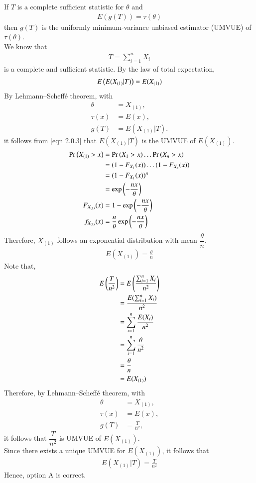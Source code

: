 \documentclass[journal,12pt,twocolumn]{IEEEtran}
\begin{document}
If $T$ is a complete sufficient statistic for $\theta$ and 
\begin{align}
\label{eqn 2.0.1}
E(g(T)) = \tau(\theta)
\end{align}
then $g(T)$ is the uniformly minimum-variance unbiased estimator (UMVUE) of $\tau(\theta)$.\\

We know that 
\begin{align}
T = \sum_{i=1}^{n} X_i
\end{align}
is a complete and sufficient statistic. By the law of total expectation, 
\begin{align}
\label{eqn 2.0.3}
E\left(E(X_{(1)} | T )\right) = E(X_{(1)})
\end{align}
By Lehmann–Scheffé theorem, with
\begin{align}
\theta &= X_{(1)},\\ 
\tau(x) &= E(x),\\
g(T) &= E(X_{(1)} | T).
\end{align}
it follows from \eqref{eqn 2.0.3} that $E(X_{(1)} | T)$ is the UMVUE of $E(X_{(1)})$.
\begin{align}
\Pr\left(X_{(1)} > x\right) &= \Pr\left(X_1 > x\right)\ldots \Pr\left(X_n > x\right)\\
&= (1-F_{X_{1}}(x))\ldots(1-F_{X_{n}}(x))\\
&= (1-F_{X_{1}}(x))^n \\
&= \exp\left(-\frac{nx}{\theta}\right)\\
F_{X_{(1)}}(x) &= 1 - \exp\left(-\frac{nx}{\theta}\right)\\
f_{X_{(1)}}(x) &= \frac{n}{\theta} \exp\left(-\frac{nx}{\theta}\right)
\end{align}
Therefore, $X_{(1)}$ follows an exponential distribution with mean $\dfrac{\theta}{n}$.
\begin{align}
E(X_{(1)}) = \frac{\theta}{n}
\end{align}
Note that,
\begin{align}
E\left(\frac{T}{n^2}\right) &= E\left(\frac{\sum_{i=1}^n X_i}{n^2}\right)\\
&= \frac{E(\sum_{i=1}^n X_i)}{n^2}\\
&= \sum_{i=1}^n \frac{E(X_i)}{n^2}\\
&= \sum_{i=1}^n \frac{\theta}{n^2}\\
&= \frac{\theta}{n}\\
&= E(X_{(1)})
\end{align}
Therefore, by Lehmann–Scheffé theorem, with
\begin{align}
\theta &= X_{(1)},\\
\tau(x) &= E(x),\\
g(T) &= \frac{T}{n^2},
\end{align}
it follows that $\dfrac{T}{n^2}$ is UMVUE of $E(X_{(1)})$.\\

Since there exists a unique UMVUE for $E(X_{(1)})$, it follows that 
\begin{align}
E(X_{(1)} | T) = \frac{T}{n^2}
\end{align}
Hence, option A is correct.
\end{document}
